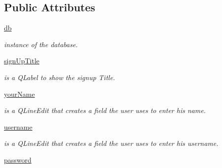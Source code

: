 \subsection*{Public Attributes}
\begin{DoxyCompactItemize}
\item 
\hyperlink{classsrc_1_1login__menu_1_1_login_menu_a9a3d5cb39385fb4b3d10f46af5543205}{db}
\begin{DoxyCompactList}\small\item\em instance of the database. \end{DoxyCompactList}\item 
\hyperlink{classsrc_1_1login__menu_1_1_login_menu_a07a65e6211f15b49d6e6abc0daac320b}{sign\+Up\+Title}
\begin{DoxyCompactList}\small\item\em is a Q\+Label to show the signup Title. \end{DoxyCompactList}\item 
\hyperlink{classsrc_1_1login__menu_1_1_login_menu_a6ba84d7d5a18940588ad710b7f6f964c}{your\+Name}
\begin{DoxyCompactList}\small\item\em is a Q\+Line\+Edit that creates a field the user uses to enter his name. \end{DoxyCompactList}\item 
\hyperlink{classsrc_1_1login__menu_1_1_login_menu_a6b5acd3b5dd7c538b601cf8ab1b1d4cf}{username}
\begin{DoxyCompactList}\small\item\em is a Q\+Line\+Edit that creates a field the user uses to enter his username. \end{DoxyCompactList}\item 
\hypertarget{classsrc_1_1login__menu_1_1_login_menu_a036845330836e34588c87e2d73f53b85}{}\hyperlink{classsrc_1_1login__menu_1_1_login_menu_a036845330836e34588c87e2d73f53b85}{password}\label{classsrc_1_1login__menu_1_1_login_menu_a036845330836e34588c87e2d73f53b85}


\end{DoxyCompactItemize}
